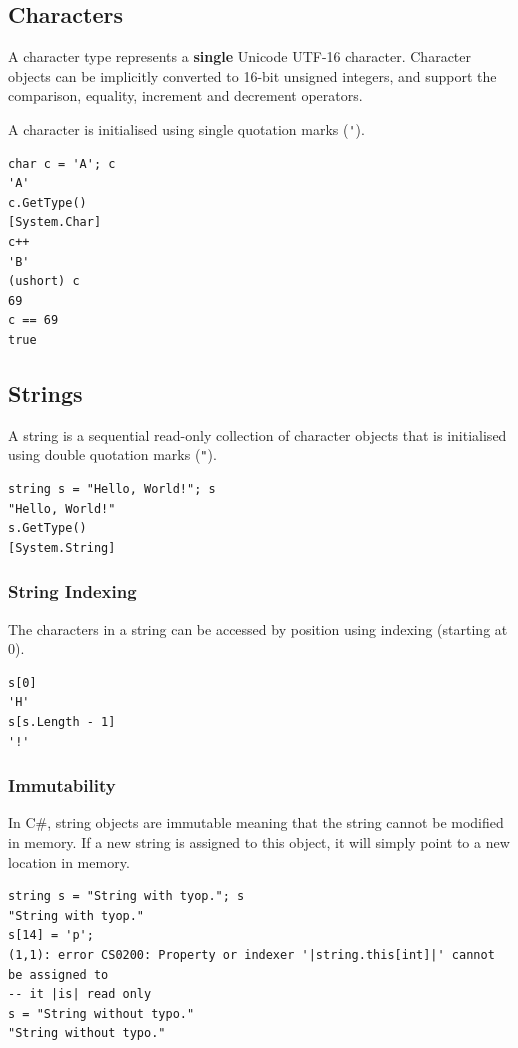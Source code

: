 \documentclass{article}
\def\customlinemarker#1#2{
    \edef\thelstnumber{%
        \unexpanded{%
            \ifnum#1=\value{lstnumber}\relax
              #2%
            \fi}%
        \ifx\thelstnumber\relax\else
        \expandafter\unexpanded\expandafter{\thelstnumber}%
        \fi
    }
}
\begin{document}
\subsection{Characters}
A character type represents a \textbf{single} Unicode UTF-16 character.
Character objects can be implicitly converted to 16-bit unsigned integers, and
support the comparison, equality, increment and \linebreak decrement operators.

A character is initialised using single quotation marks (\lstinline{'}). %
\begingroup
\let\thelstnumber\relax
\customlinemarker{1}{\$}
\customlinemarker{3}{\$}
\customlinemarker{5}{\$}
\customlinemarker{7}{\$}
\customlinemarker{9}{\$}
\begin{lstlisting}
char c = 'A'; c
'A'
c.GetType()
[System.Char]
c++
'B'
(ushort) c
69
c == 69
true
\end{lstlisting}
\endgroup
\subsection{Strings}
A string is a sequential read-only collection of character objects that
is initialised using double quotation marks (\lstinline{"}). %
\begingroup
\let\thelstnumber\relax
\customlinemarker{1}{\$}
\customlinemarker{3}{\$}
\begin{lstlisting}
string s = "Hello, World!"; s
"Hello, World!"
s.GetType()
[System.String]
\end{lstlisting}
\endgroup
\subsubsection{String Indexing}
The characters in a string can be accessed by position using indexing (starting at 0).
\begingroup
\let\thelstnumber\relax
\customlinemarker{1}{\$}
\customlinemarker{3}{\$}
\begin{lstlisting}
s[0]
'H'
s[s.Length - 1]
'!'
\end{lstlisting}
\endgroup
\subsubsection{Immutability}
In C\#, string objects are immutable meaning that the string cannot be modified in memory. If a new string is assigned
to this object, it will simply point to a new location in memory.
\begingroup
\let\thelstnumber\relax
\customlinemarker{1}{\$}
\customlinemarker{3}{\$}
\customlinemarker{6}{\$}
\begin{lstlisting}[escapeinside=||]
string s = "String with tyop."; s
"String with tyop."
s[14] = 'p';
(1,1): error CS0200: Property or indexer '|string.this[int]|' cannot be assigned to 
-- it |is| read only
s = "String without typo."
"String without typo."
\end{lstlisting}
\endgroup
\end{document}
